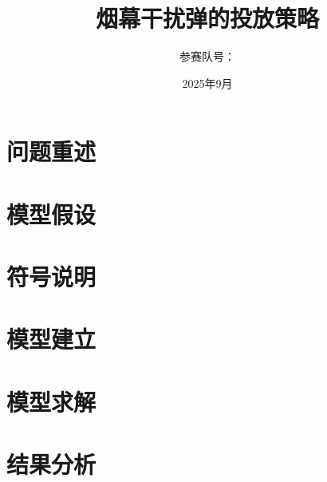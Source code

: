 \documentclass[12pt,a4paper]{ctexart}
\title{\textbf{烟幕干扰弹的投放策略}}
\author{%
    \small 参赛队号：\underline{\hspace{3cm}}
}
\date{2025年9月}
\begin{document}
\maketitle
\thispagestyle{empty}



\newpage

\section{问题重述}


\section{模型假设}


\section{符号说明}


\section{模型建立}


\section{模型求解}


\section{结果分析}


\end{document}
